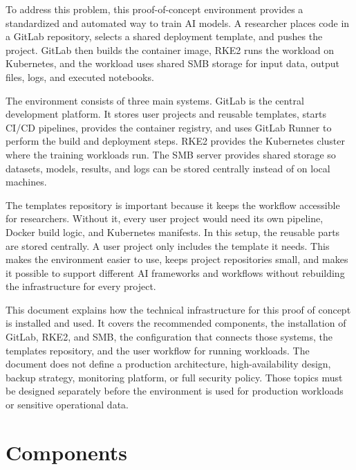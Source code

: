 \documentclass{article}
\begin{document}
\vspace{0.5cm}

To address this problem, this proof-of-concept environment provides a standardized and automated way to train AI models. A researcher places code in a GitLab repository, selects a shared deployment template, and pushes the project. GitLab then builds the container image, RKE2 runs the workload on Kubernetes, and the workload uses shared SMB storage for input data, output files, logs, and executed notebooks.

\vspace{0.5cm}

The environment consists of three main systems. GitLab is the central development platform. It stores user projects and reusable templates, starts CI/CD pipelines, provides the container registry, and uses GitLab Runner to perform the build and deployment steps. RKE2 provides the Kubernetes cluster where the training workloads run. The SMB server provides shared storage so datasets, models, results, and logs can be stored centrally instead of on local machines.

\vspace{0.5cm}

The templates repository is important because it keeps the workflow accessible for researchers. Without it, every user project would need its own pipeline, Docker build logic, and Kubernetes manifests. In this setup, the reusable parts are stored centrally. A user project only includes the template it needs. This makes the environment easier to use, keeps project repositories small, and makes it possible to support different AI frameworks and workflows without rebuilding the infrastructure for every project.

\vspace{0.5cm}

This document explains how the technical infrastructure for this proof of concept is installed and used. It covers the recommended components, the installation of GitLab, RKE2, and SMB, the configuration that connects those systems, the templates repository, and the user workflow for running workloads. The document does not define a production architecture, high-availability design, backup strategy, monitoring platform, or full security policy. Those topics must be designed separately before the environment is used for production workloads or sensitive operational data.

\newpage
\section{Components}
\end{document}
